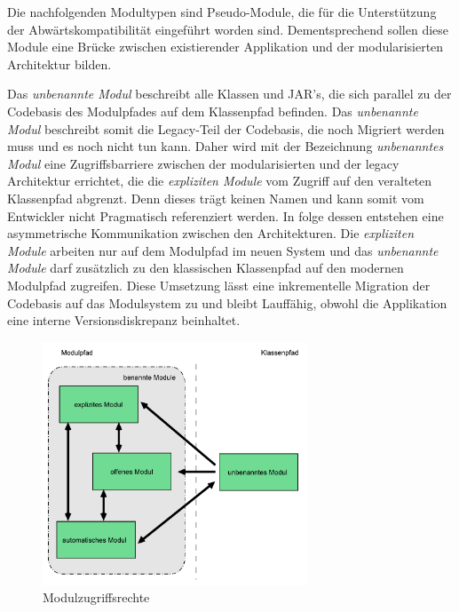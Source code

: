     Die nachfolgenden Modultypen sind Pseudo-Module, die für die Unterstützung der Abwärtskompatibilität eingeführt worden sind. 
    Dementsprechend sollen diese Module eine Brücke zwischen existierender Applikation und der modularisierten Architektur bilden.\bigbreak

    Das \textit{unbenannte Modul} beschreibt alle Klassen und JAR's, die sich parallel zu der Codebasis des Modulpfades auf dem Klassenpfad befinden. Das \textit{unbenannte Modul} beschreibt somit die Legacy-Teil der Codebasis, die noch Migriert werden muss und es noch nicht tun kann. Daher wird mit der Bezeichnung \textit{unbenanntes Modul} eine Zugriffsbarriere zwischen der modularisierten und der legacy Architektur errichtet, die die \textit{expliziten Module} vom Zugriff auf den veralteten Klassenpfad abgrenzt. Denn dieses trägt keinen Namen und kann somit vom Entwickler nicht Pragmatisch referenziert werden.\newline
    In folge dessen entstehen eine asymmetrische Kommunikation zwischen den Architekturen. Die \textit{expliziten Module} arbeiten nur auf dem Modulpfad im neuen System und das \textit{unbenannte Module} darf zusätzlich zu den klassischen Klassenpfad auf den modernen Modulpfad zugreifen. Diese Umsetzung lässt eine inkrementelle Migration der Codebasis auf das Modulsystem zu und bleibt Lauffähig, obwohl die Applikation eine interne Versionsdiskrepanz beinhaltet. \cite{modulMitJava9,java9modRevealed,modulProgJava9}

    \begin{figure}[h]
      \centering
      \includegraphics[width=0.7\textwidth]{material/images/module-access.pdf}
      \caption{Modulzugriffsrechte \cite{modulMitJava9}}
      \label{fig:modacc}
    \end{figure}

